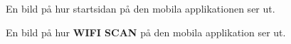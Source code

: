 \documentclass[a4paper,12pt]{article}
\begin{document}
 \begin{figure}[H]
   \centering
   \caption{En bild på hur startsidan på den mobila applikationen ser ut.}
   \label{fig:mob_main}
 \end{figure}

 \begin{figure}[H]
   \centering
   \caption{En bild på hur \textbf{WIFI SCAN} på den mobila applikation ser ut.}
   \label{fig:mob_scan_cal}
 \end{figure}
\end{document}

